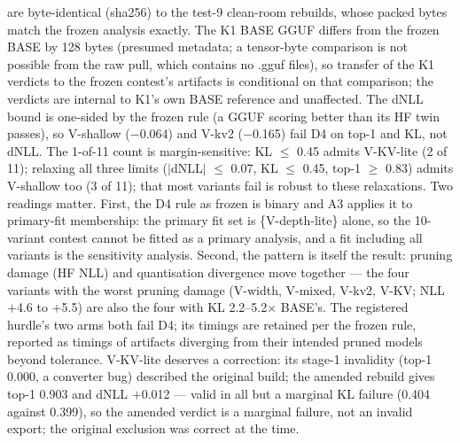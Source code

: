 \documentclass[10pt,letterpaper,twocolumn]{article}
\begin{document}
are byte-identical (sha256) to the test-9 clean-room rebuilds,
whose packed bytes match the frozen analysis exactly. The K1 BASE GGUF
differs from the frozen BASE by 128 bytes (presumed metadata;
a tensor-byte comparison is not possible from the raw pull,
which contains no .gguf files), so
transfer of the K1 verdicts to the frozen contest's artifacts
is conditional on that comparison; the verdicts are internal
to K1's own BASE reference and unaffected. The dNLL bound is
one-sided by the frozen rule (a GGUF scoring better than its HF
twin passes), so V-shallow ($-$0.064) and V-kv2 ($-$0.165)
fail D4 on top-1 and KL, not dNLL. The 1-of-11 count is
margin-sensitive: KL $\leq$ 0.45 admits V-KV-lite (2 of 11);
relaxing all three limits ($|$dNLL$|$ $\leq$ 0.07, KL $\leq$ 0.45,
top-1 $\geq$ 0.83) admits V-shallow too (3 of 11); that most
variants fail is robust to these relaxations. Two readings matter. First, the D4 rule as frozen is
binary and A3 applies it to primary-fit membership: the primary
fit set is \{V-depth-lite\} alone, so the 10-variant contest
cannot be fitted as a primary analysis, and a fit including all
variants is the sensitivity analysis. Second, the pattern is itself the
result: pruning damage (HF NLL) and quantisation divergence move
together --- the four variants with the worst pruning damage
(V-width, V-mixed, V-kv2, V-KV; NLL $+$4.6 to $+$5.5) are also the four with KL 2.2--5.2$\times$ BASE's. The registered hurdle's two arms both fail
D4; its timings are retained per the frozen rule, reported as timings of artifacts diverging from their intended pruned models beyond tolerance.
V-KV-lite deserves a correction: its stage-1 invalidity (top-1
0.000, a converter bug) described the original build; the amended
rebuild gives top-1 0.903 and dNLL $+$0.012 --- valid in all but a marginal KL failure (0.404 against 0.399), so the amended verdict is a marginal failure, not an invalid export; the original exclusion was correct at the time.
\end{document}
